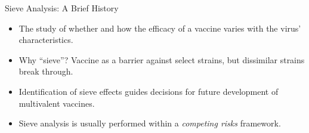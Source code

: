 \documentclass[12pt,t,handout]{beamer}
\begin{document}
\begin{frame}[c]{Sieve Analysis: A Brief History}

\begin{center}
\begin{itemize}
  \itemsep10pt
  \item The study of whether and how the efficacy of a vaccine varies with the
    virus' characteristics.
  \item Why ``sieve''? Vaccine as a barrier against select strains, but
    dissimilar strains break through.
  \item Identification of sieve effects guides decisions for future development
    of multivalent vaccines.
  \item Sieve analysis is usually performed within a \textit{competing risks}
    framework.
\end{itemize}
\end{center}


\end{frame}

\end{document}
